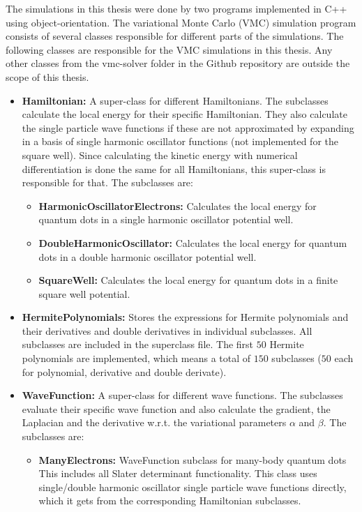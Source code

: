 \documentclass[../main.tex]{subfiles}
\begin{document}
\begin{appendices}
The simulations in this thesis were done by two programs implemented in C++ using object-orientation. 
The variational Monte Carlo (VMC) simulation program consists of several classes responsible for different parts of the simulations. The following classes are responsible for the VMC simulations in this thesis. Any other classes from the vmc-solver folder in the Github repository \cite{github} are outside the scope of this thesis.
\begin{itemize}
    \item {\bf Hamiltonian:} A super-class for different Hamiltonians. The subclasses calculate the local energy for their specific Hamiltonian. They also calculate the single particle wave functions if these are not approximated by expanding in a basis of single harmonic oscillator functions (not implemented for the square well). Since calculating the kinetic energy with numerical differentiation is done the same for all Hamiltonians, this super-class is responsible for that. The subclasses are:
    \begin{itemize}
        \item \textbf{HarmonicOscillatorElectrons:} Calculates the local energy for quantum dots in a single harmonic oscillator potential well.
        \item \textbf{DoubleHarmonicOscillator:} Calculates the local energy for quantum dots in a double harmonic oscillator potential well.
        \item \textbf{SquareWell:} Calculates the local energy for quantum dots in a finite square well potential.
    \end{itemize}
    \item \textbf{HermitePolynomials:} Stores the expressions for Hermite polynomials and their derivatives and double derivatives in individual subclasses. All subclasses are included in the superclass file. The first $50$ Hermite polynomials are implemented, which means a total of $150$ subclasses ($50$ each for polynomial, derivative and double derivate).
    \item {\bf WaveFunction:} A super-class for different wave functions. The subclasses evaluate their specific wave function and also calculate the gradient, the Laplacian and the derivative w.r.t. the variational parameters $\alpha$ and $\beta$. The subclasses are:
    \begin{itemize}
        \item \textbf{ManyElectrons:} WaveFunction subclass for many-body quantum dots This includes all Slater determinant functionality. This class uses single/double harmonic oscillator single particle wave functions directly, which it gets from the corresponding Hamiltonian subclasses.

\end{itemize}
\end{itemize}
\end{appendices}
\end{document}

